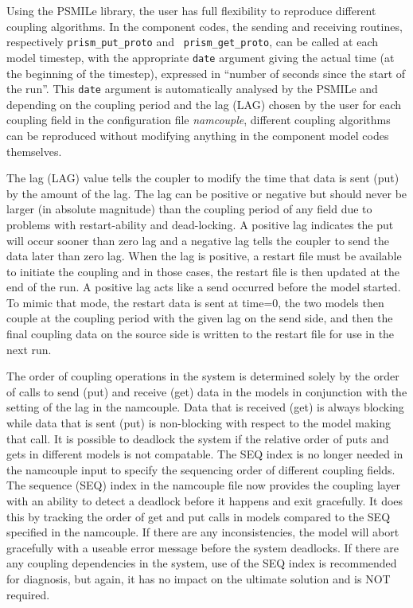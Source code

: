 Using the PSMILe library, the user has full flexibility to reproduce
different coupling algorithms. In the component codes, the sending and
receiving routines, respectively {\tt prism\_put\_proto} and {\tt
  prism\_get\_proto}, can be called at each model timestep, with the
appropriate {\tt date} argument giving the actual time (at the
beginning of the timestep), expressed in ``number of seconds since the
start of the run''. This {\tt date} argument is automatically analysed
by the PSMILe
and depending on the coupling period and the lag (LAG) chosen by the 
user for each coupling field in the configuration file {\it namcouple}, different
coupling algorithms can be reproduced without modifying anything in the
component model codes themselves. 

The lag (LAG) value tells the coupler to modify the time that data
is sent (put) by the amount of the lag.  The lag can be positive or
negative but should never be larger (in absolute magnitude) than the
coupling period of any field due to problems with restart-ability and
dead-locking.  A positive lag indicates the
put will occur sooner than zero lag and a negative lag tells the coupler
to send the data later than zero lag.  When the lag is positive, 
a restart file must be available to initiate the coupling and in those cases, 
the restart file is then updated at the end of the run.  A positive
lag acts like a send occurred before the model started.  To mimic that
mode, the restart data is sent at time=0, the two models then couple at the coupling
period with the given lag on the send side, and then the final coupling
data on the source side is written to the restart file for use in the
next run.  

The order of coupling operations in the system is determined solely
by the order of calls to send (put) and receive (get) data in the models
in conjunction with the setting of the lag in the namcouple.  Data that is
received (get) is always blocking while data that is sent (put) is non-blocking
with respect to the model making that call.  It is possible
to deadlock the system if the relative order of puts and gets in different
models is not compatable.  The SEQ index is no longer needed in the namcouple
input to specify the sequencing order of different coupling fields.
The sequence (SEQ) index in the namcouple file now provides the coupling 
layer with an ability to detect a deadlock before it happens and exit 
gracefully.  It does this by tracking the order of get and put calls in
models compared to the SEQ specified in the namcouple.  If there are any
inconsistencies, the model will abort gracefully with a useable error
message before the system deadlocks.  If there are any coupling dependencies
in the system, use of the SEQ index is recommended for diagnosis, but again,
it has no impact on the ultimate solution and is NOT required.

